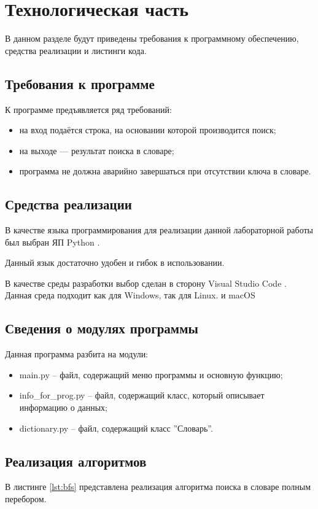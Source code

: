\chapter{Технологическая часть}
В данном разделе будут приведены требования к программному обеспечению, средства реализации и листинги кода.

\section{Требования к программе}

К программе предъявляется ряд требований:
\begin{itemize}
	\item на вход подаётся строка, на основании которой производится поиск;
	\item на выходе --- результат поиска в словаре;
	\item программа не должна аварийно завершаться при отсутствии ключа в словаре.
\end{itemize}

\section{Средства реализации}

В качестве языка программирования для реализации данной лабораторной работы был выбран ЯП Python \cite{pythonlang}. 

Данный язык достаточно удобен и гибок в использовании. 

В качестве среды разработки выбор сделан в сторону Visual Studio Code \cite{wind}. Данная среда подходит как для Windows, так для Linux. и macOS

\section{Сведения о модулях программы}
Данная программа разбита на модули:
\begin{itemize}
	\item main.py -- файл, содержащий меню программы и основную функцию;
	\item info\_for\_prog.py -- файл, содержащий класс, который описывает информацию о данных;
	\item dictionary.py -- файл, содержащий класс ''Словарь''.
\end{itemize}

\section{Реализация алгоритмов}
В листинге \ref{lst:bfs} представлена реализация алгоритма поиска в словаре полным перебором.

